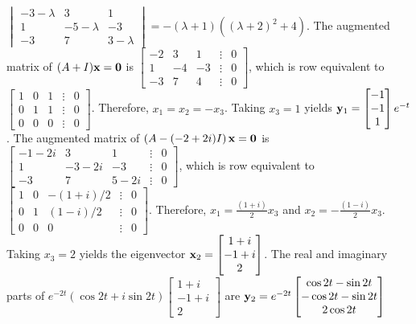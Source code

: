 \documentclass{ximera}
\begin{document}
\begin{problem}
\begin{solution}
    $\begin{vmatrix}-3-\lambda&3&1\\1&-5-\lambda&-3\\-3
&7&3-\lambda\end{vmatrix}=-(\lambda+1)\left((\lambda+2)^2+4\right)$.
 The augmented matrix of $(A+I){\bf x=0}$ is
$ \begin{bmatrix}-2&3&1&\vdots&0\\1&-4&-3&\vdots&0\\
-3&7&4&\vdots&0 \end{bmatrix}$,
which is row equivalent to
$ \begin{bmatrix} 1&0&1&\vdots&0\\ 0&1&1&
\vdots&0\\ 0&0&0&\vdots&0 \end{bmatrix}$.
Therefore,    $x_1=x_2=-x_3$.  Taking $x_3=1$ yields
 ${\bf y}_1= \begin{bmatrix}-1\\-1\\1 \end{bmatrix}e^{-t}$.
The augmented matrix of
$\left(A-(-2+2i)I\right){\bf x=0}$ is
$ \begin{bmatrix}-1-2i&3&1&\vdots&0\\1&
-3-2i&-3&\vdots&0\\-3&7&5-2i&\vdots&0
 \end{bmatrix}$,
which is row equivalent to
$ \begin{bmatrix} 1&0&-(1+i)/2&\vdots&0\\
0&1&(1-i)/2&
\vdots&0\\ 0&0&0&\vdots&0 \end{bmatrix}$.
Therefore,    $x_1=\frac{(1+i) }{2}x_3$ and $x_2=-\frac{(1-i) }{2}x_3$.
Taking $x_3=2$ yields the eigenvector
${\bf x}_2= \begin{bmatrix}1+i\\-1+i\\2 \end{bmatrix}$.
The real and imaginary parts of
$e^{-2t}(\cos2t+i\sin2t) \begin{bmatrix}1+i\\-1+i\\2 \end{bmatrix}$
 are
${\bf y}_2=e^{-2t} \begin{bmatrix}\cos2t-\sin2t\\-\cos2t-\sin2t\\2\cos2t \end{bmatrix}$

\end{solution}
\end{problem}
\end{document}

